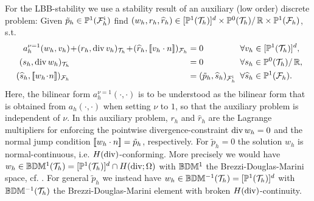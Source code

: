 \documentclass[pdflatex,sn-mathphys,Numbered]{sn-jnl}%
\renewcommand{\hat}[1]{\widehat{#1}}
\theoremstyle{remark}%
\theoremstyle{definition}%
\begin{document}
For the LBB-stability we use a stability result of an auxiliary (low order) discrete problem: Given $\tilde{p}_h \in \mathbb{P}^1({\mathcal{F}_h^{\text{i}}})$ find $(w_h,r_h,\hat{r}_h) \in [\PP^{1}(\Th)]^d \times \PP^0(\Th) /\, \RR \times \PP^1(\Fh) $, s.t.
\begin{subequations}\label{eq:aux}
\begin{align}
  a_{h}^{\nu = 1}(w_h,v_h) & \!+\! (r_h, \Div v_h)_{\Th} \!+\! (\hat{r}_h, \jmp{v_h \cdot n})_{\Fh}  &&
  \!\!\!\!\!\!= 0 &&\!\!\! \forall v_h \in [\PP^1(\Th)]^d, \label{eq:auxa}\\
  (s_h, \Div w_h)_{\Th} &&& \!\!\!\!\!\!= 0 &&\!\!\! \forall s_h \in \PP^0(\Th)  /\, \RR,\!\! \label{eq:auxb}\\
  (\hat{s}_h, \jmp{w_h \!\cdot\! n})_{\Fh} 
  &&& \!\!\!\!\!\! = (\tilde{p}_h, \hat{s}_h)_{\Fhi}   &&\!\!\! \forall \hat{s}_h \in  \PP^1(\Fh). \label{eq:auxc}
\end{align}
\end{subequations}
Here, the bilinear form $a_{h}^{\nu = 1}(\cdot,\cdot)$ is to be understood as the bilinear form that is obtained from $a_{h}(\cdot,\cdot)$ when setting $\nu$ to $1$, so that the auxiliary problem is independent of $\nu$. In this auxiliary problem, $r_h$ and $\hat{r}_h$ are the Lagrange multipliers for enforcing the pointwise divergence-constraint $\operatorname{\mathrm{div}} w_h=0$ and the normal jump condition $[\![w_h \cdot n]\!] = \tilde{p}_h$, respectively.
For $\tilde{p}_h = 0$ the solution $w_h$ is normal-continuous, i.e. $H(\operatorname{\mathrm{div}})$-conforming. More precisely we would have $w_h \in \mathbb{B}\mathbb{D}\mathbb{M}^{1}({\mathcal{T}_h}) = [\mathbb{P}^1({\mathcal{T}_h})]^d \cap H(\operatorname{\mathrm{div}};\Omega)$ with $\mathbb{B}\mathbb{D}\mathbb{M}^{1}$ the Brezzi-Douglas-Marini space, cf. \cite[Section 2.3.1]{brezzi}. For general $\tilde{p}_h$ we instead have 
$w_h \in \mathbb{B}\mathbb{D}\mathbb{M}^{-1}({\mathcal{T}_h}) = [\mathbb{P}^1({\mathcal{T}_h})]^d$ with $\mathbb{B}\mathbb{D}\mathbb{M}^{-1}({\mathcal{T}_h})$ the Brezzi-Douglas-Marini element with broken $H(\operatorname{\mathrm{div}})$-continuity.
\end{document}
